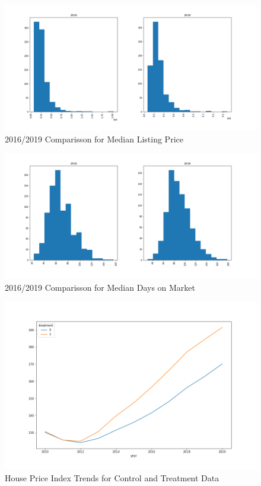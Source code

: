 \begin{figure}[h]
    \centering
    \includegraphics[width=.8\linewidth]{../data_and_processing/media/lst_prc_hist_comp_Y.png}
    \caption{2016/2019 Comparisson for Median Listing Price}
    \label{lst_prc_hist_comp_Y}
\end{figure}

\begin{figure}[h]
    \centering
    \includegraphics[width=.8\linewidth]{../data_and_processing/media/days_on_mkt_hist_comp_Y.png}
    \caption{2016/2019 Comparisson for Median Days on Market}
    \label{days_on_mkt_hist_comp_Y}
\end{figure}

\begin{figure}[h]
    \centering
    \includegraphics[width=.8\linewidth]{../data_and_processing/media/pta.png}
    \caption{House Price Index Trends for Control and Treatment Data}
    \label{pta}
\end{figure}

